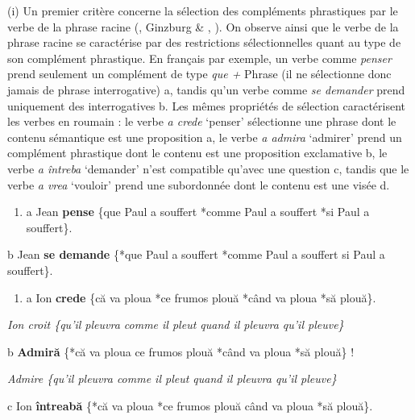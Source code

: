 (i) Un premier critère concerne la sélection des compléments phrastiques par le verbe de la phrase racine (\citet{Grimshaw1979}, Ginzburg \& \citet{Sag2000}, \citet{Marandin2008}). On observe ainsi que le verbe de la phrase racine se caractérise par des restrictions sélectionnelles quant au type de son complément phrastique. En français par exemple, un verbe comme \textit{penser} prend seulement un complément de type \textit{que +} Phrase (il ne sélectionne donc jamais de phrase interrogative) a, tandis qu'un verbe comme \textit{se demander} prend uniquement des interrogatives b. Les mêmes propriétés de sélection caractérisent les verbes en roumain : le verbe \textit{a crede} `penser' sélectionne une phrase dont le contenu sémantique est une proposition a, le verbe \textit{a admira} `admirer' prend un complément phrastique dont le contenu est une proposition exclamative b, le verbe \textit{a întreba} `demander' n'est compatible qu'avec une question c, tandis que le verbe \textit{a vrea} `vouloir' prend une subordonnée dont le contenu est une visée d.


\begin{enumerate}
\item \label{bkm:Ref299268979}a  Jean \textbf{pense} \{que Paul a souffert {\textbar} *comme Paul a souffert {\textbar} *si Paul a souffert\}.


\end{enumerate}
  b  Jean \textbf{se demande} \{*que Paul a souffert {\textbar} *comme Paul a souffert {\textbar} si Paul a souffert\}.


\begin{enumerate}
\item \label{bkm:Ref299269517}a  Ion \textbf{crede} \{că va ploua {\textbar} *ce frumos plouă {\textbar} *când va ploua {\textbar} *să plouă\}.


\end{enumerate}
{\itshape
Ion croit \{qu'il pleuvra {\textbar} comme il pleut {\textbar} quand il pleuvra {\textbar} qu'il pleuve\}}

  b  \textbf{Admiră} \{*că va ploua {\textbar} ce frumos plouă {\textbar} *când va ploua {\textbar} *să plouă\} !

{\itshape
    Admire \{qu'il pleuvra {\textbar} comme il pleut {\textbar} quand il pleuvra {\textbar} qu'il pleuve\} } 

  c  Ion \textbf{întreabă} \{*că va ploua {\textbar} *ce frumos plouă {\textbar} când va ploua {\textbar} *să plouă\}.

